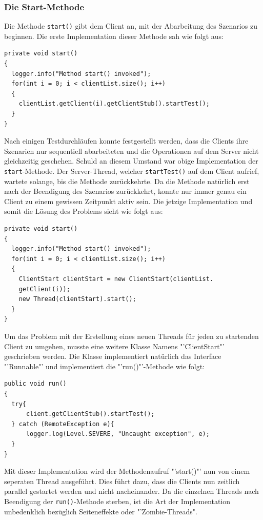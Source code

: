 \subsubsection{Die Start-Methode}
\label{sec:startMethode}

Die Methode \texttt{start()} gibt dem Client an, mit der Abarbeitung des Szenarios zu beginnen. Die erste Implementation dieser Methode sah wie folgt aus:
\begin{verbatim}
private void start()
{
  logger.info("Method start() invoked");
  for(int i = 0; i < clientList.size(); i++)
  {
    clientList.getClient(i).getClientStub().startTest();
  }
}
\end{verbatim}

Nach einigen Testdurchläufen konnte festgestellt werden, dass die Clients ihre Szenarien nur sequentiell abarbeiteten und die Operationen auf dem Server nicht gleichzeitig geschehen. Schuld an diesem Umstand war obige Implementation der \texttt{start}-Methode. Der Server-Thread, welcher \texttt{startTest()} auf dem Client aufrief, wartete solange, bis die Methode zurückkehrte. Da die Methode natürlich erst nach der Beendigung des Szenarios zurückkehrt, konnte nur immer genau ein Client zu einem gewissen Zeitpunkt aktiv sein.\newline
Die jetzige Implementation und somit die Lösung des Problems sieht wie folgt aus:
\begin{verbatim}
private void start()
{
  logger.info("Method start() invoked");
  for(int i = 0; i < clientList.size(); i++)
  {
    ClientStart clientStart = new ClientStart(clientList.
    getClient(i));
    new Thread(clientStart).start();
  }
}
\end{verbatim}
Um das Problem mit der Er\-stel\-lung ei\-nes neu\-en Th\-reads für je\-den zu startenden Client zu umgehen, musste eine weitere Klasse Namens "'Client\-Start"' ge\-schrie\-ben wer\-den. Die Klas\-se im\-p\-le\-men\-tiert natür\-lich das Inter\-face "'Run\-nable"' und im\-p\-le\-men\-tiert die "'run()"'-Methode wie folgt:
\begin{verbatim}
public void run() 
{
  try{
      client.getClientStub().startTest();
  } catch (RemoteException e){
      logger.log(Level.SEVERE, "Uncaught exception", e);
  }
}
\end{verbatim}


Mit dieser Im\-ple\-men\-ta\-tion wird der Me\-tho\-den\-auf\-ruf "'start()"' nun von einem se\-pe\-rat\-en Thread ausgeführt. Dies führt dazu, dass die Clients nun zeitlich parallel gestartet werden und nicht nacheinander. Da die einzelnen Threads nach Beendigung der \texttt{run()}-Methode sterben, ist die Art der Implementation unbedenklich bezüglich Seiteneffekte oder "'Zombie-Threads".

